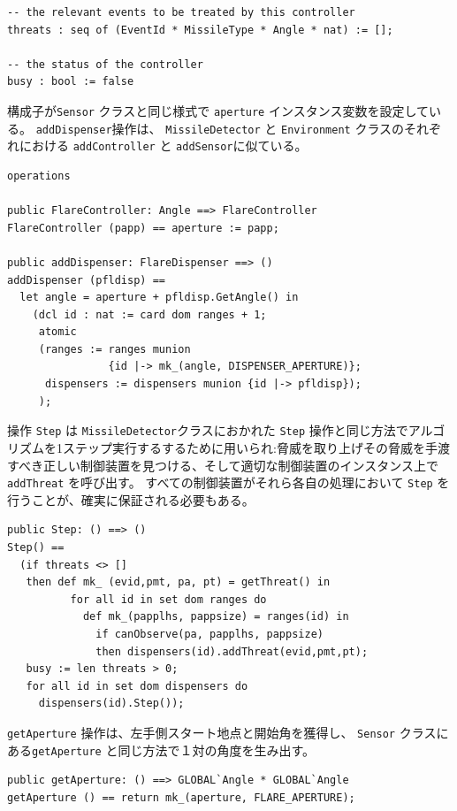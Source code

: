 \documentclass[\pformat,12pt]{jreport}
\begin{document}
\begin{lstlisting}
-- the relevant events to be treated by this controller
threats : seq of (EventId * MissileType * Angle * nat) := [];

-- the status of the controller
busy : bool := false
\end{lstlisting}

構成子が\texttt{Sensor} クラスと同じ様式で \texttt{aperture} インスタンス変数を設定している。
 \texttt{addDispenser}操作は、 \texttt{MissileDetector} と \texttt{Environment} クラスのそれぞれにおける \texttt{addController} と \texttt{addSensor}に似ている。

\begin{lstlisting}
operations

public FlareController: Angle ==> FlareController
FlareController (papp) == aperture := papp;

public addDispenser: FlareDispenser ==> ()
addDispenser (pfldisp) ==
  let angle = aperture + pfldisp.GetAngle() in
    (dcl id : nat := card dom ranges + 1;
     atomic
     (ranges := ranges munion 
                {id |-> mk_(angle, DISPENSER_APERTURE)};
      dispensers := dispensers munion {id |-> pfldisp});
     );
\end{lstlisting}

操作 \texttt{Step} は  \texttt{MissileDetector}クラスにおかれた \texttt{Step} 操作と同じ方法でアルゴリズムを1ステップ実行するするために用いられ:脅威を取り上げその脅威を手渡すべき正しい制御装置を見つける、そして適切な制御装置のインスタンス上で \texttt{addThreat} を呼び出す。
すべての制御装置がそれら各自の処理において \texttt{Step} を行うことが、確実に保証される必要もある。

\begin{lstlisting}
public Step: () ==> ()
Step() ==
  (if threats <> []
   then def mk_ (evid,pmt, pa, pt) = getThreat() in
          for all id in set dom ranges do
            def mk_(papplhs, pappsize) = ranges(id) in
              if canObserve(pa, papplhs, pappsize)
              then dispensers(id).addThreat(evid,pmt,pt);
   busy := len threats > 0;
   for all id in set dom dispensers do
     dispensers(id).Step());
\end{lstlisting}

\texttt{getAperture} 操作は、左手側スタート地点と開始角を獲得し、 \texttt{Sensor} クラスにある\texttt{getAperture} と同じ方法で１対の角度を生み出す。

\begin{lstlisting}
public getAperture: () ==> GLOBAL`Angle * GLOBAL`Angle
getAperture () == return mk_(aperture, FLARE_APERTURE);
\end{lstlisting}
\end{document}
